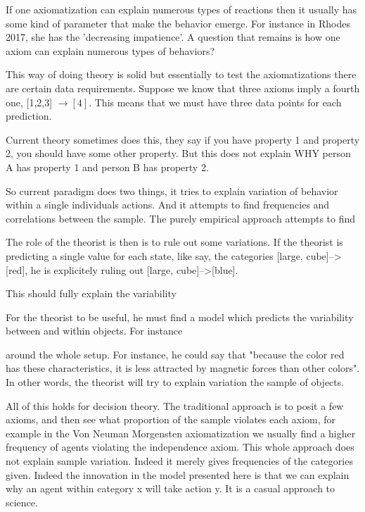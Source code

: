 \documentclass[11pt]{article}
\numberwithin{equation}{section}
\begin{document}
If one axiomatization can explain numerous types of reactions then it usually has some kind of parameter that make the behavior emerge. For instance in Rhodes 2017, she has the 'decreasing impatience'. A question that remains is how one axiom can explain numerous types of behaviors? 

This way of doing theory is solid but essentially to test the axiomatizations there are certain data requirements. Suppose we know that three axioms imply a fourth one, [1,2,3] $\rightarrow [4]$. This means that we must have three data points for each prediction. 

Current theory sometimes does this, they say if you have property 1 and property 2, you should have some other property. But this does not explain WHY person A has property 1 and person B has property 2. 

So current paradigm does two things, it tries to explain variation of behavior within a single individuals actions. And it attempts to find frequencies and correlations between the sample. The purely empirical approach attempts to find 

The role of the theorist is then is to rule out some variations. If the theorist is predicting a single value for each state, like say, the categories [large, cube]-->[red], he is explicitely ruling out [large, cube]-->[blue]. 

This should fully explain the variability 

For the theorist to be useful, he must find a model which predicts the variability between and within objects. For instance  

around the whole setup. For instance, he could say that "because the color red has these characteristics, it is less attracted by magnetic forces than other colors". In other words, the theorist will try to explain variation  the sample of objects. 

All of this holds for decision theory. The traditional approach is to posit a few axioms, and then see what proportion of the sample violates each axiom, for example in the Von Neuman Morgensten axiomatization we usually find a higher frequency of agents violating the independence axiom. This whole approach does not explain  sample variation. Indeed it merely gives frequencies of the categories given. Indeed the innovation in the model presented here is that we can explain why an agent within category x will take action y. It is a casual approach to science. 
\end{document}
